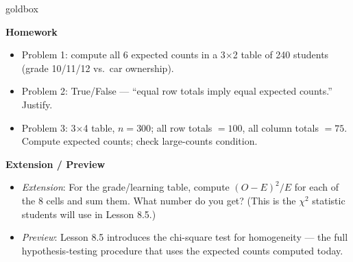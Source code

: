 \documentclass[10pt]{article}
\begin{document}
\begin{skillbox}{goldbox}
\begin{minipage}[t]{0.48\linewidth}
    \textbf{Homework}
    \begin{itemize}
        \item Problem 1: compute all 6 expected counts in a 3$\times$2 table of
              240 students (grade 10/11/12 vs.\ car ownership).
        \item Problem 2: True/False --- ``equal row totals imply equal expected counts.''
              Justify.
        \item Problem 3: 3$\times$4 table, $n = 300$; all row totals $= 100$, all column
              totals $= 75$. Compute expected counts; check large-counts condition.
    \end{itemize}
\end{minipage}
\hfill
\begin{minipage}[t]{0.48\linewidth}
    \textbf{Extension / Preview}
    \begin{itemize}
        \item \textit{Extension}: For the grade/learning table, compute $(O - E)^2/E$
              for each of the 8 cells and sum them. What number do you get? (This is the
              $\chi^2$ statistic students will use in Lesson 8.5.)
        \item \textit{Preview}: Lesson 8.5 introduces the chi-square test for homogeneity ---
              the full hypothesis-testing procedure that uses the expected counts computed
              today.
    \end{itemize}
\end{minipage}
\end{skillbox}
\end{document}
